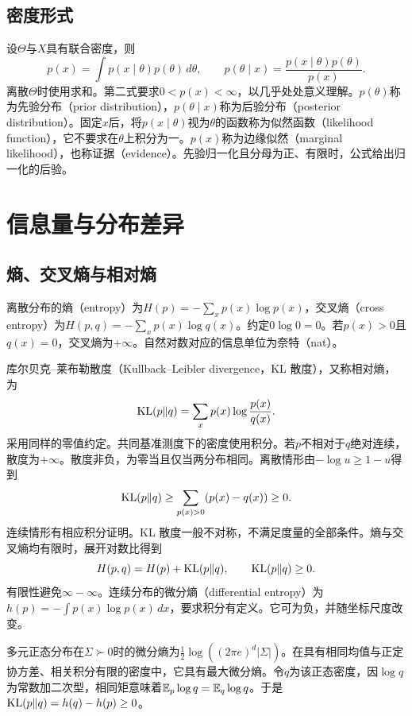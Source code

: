 \subsection{密度形式}
设$\Theta$与$X$具有联合密度，则
\begin{equation}
 p(x)=\int p(x\mid\theta)p(\theta)\,d\theta,\qquad
 p(\theta\mid x)=\frac{p(x\mid\theta)p(\theta)}{p(x)}.
\end{equation}
离散$\Theta$时使用求和。第二式要求$0<p(x)<\infty$，以几乎处处意义理解。$p(\theta)$称为先验分布（prior distribution），$p(\theta\mid x)$称为后验分布（posterior distribution）。固定$x$后，将$p(x\mid\theta)$视为$\theta$的函数称为似然函数（likelihood function），它不要求在$\theta$上积分为一。$p(x)$称为边缘似然（marginal likelihood），也称证据（evidence）。先验归一化且分母为正、有限时，公式给出归一化的后验。

\section{信息量与分布差异}
\subsection{熵、交叉熵与相对熵}
离散分布的熵（entropy）为$H(p)=-\sum_xp(x)\log p(x)$，交叉熵（cross entropy）为$H(p,q)=-\sum_xp(x)\log q(x)$。约定$0\log0=0$。若$p(x)>0$且$q(x)=0$，交叉熵为$+\infty$。自然对数对应的信息单位为奈特（nat）。

库尔贝克--莱布勒散度（Kullback--Leibler divergence，KL 散度），又称相对熵，为
\begin{equation}
 \operatorname{KL}(p\|q)=\sum_xp(x)\log\frac{p(x)}{q(x)}.
 \label{eq:math-kl-distance}
\end{equation}
采用同样的零值约定。共同基准测度下的密度使用积分。若$p$不相对于$q$绝对连续，散度为$+\infty$。散度非负，为零当且仅当两分布相同。离散情形由$-\log u\geq1-u$得到
\begin{equation}
 \operatorname{KL}(p\|q)\geq\sum_{p(x)>0}(p(x)-q(x))\geq0.
\end{equation}
连续情形有相应积分证明。KL 散度一般不对称，不满足度量的全部条件。熵与交叉熵均有限时，展开对数比得到
\begin{equation}
 H(p,q)=H(p)+\operatorname{KL}(p\|q),\qquad\operatorname{KL}(p\|q)\geq0.
 \label{eq:math-cross-entropy-kl}
\end{equation}
有限性避免$\infty-\infty$。连续分布的微分熵（differential entropy）为$h(p)=-\int p(x)\log p(x)\,dx$，要求积分有定义。它可为负，并随坐标尺度改变。

多元正态分布在$\Sigma\succ0$时的微分熵为$\tfrac12\log((2\pi e)^d|\Sigma|)$。在具有相同均值与正定协方差、相关积分有限的密度中，它具有最大微分熵。令$q$为该正态密度，因$\log q$为常数加二次型，相同矩意味着$\mathbb{E}_p\log q=\mathbb{E}_q\log q$。于是$\operatorname{KL}(p\|q)=h(q)-h(p)\geq0$。

